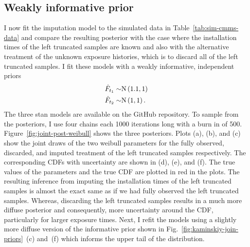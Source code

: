 

\subsection{Weakly informative prior} \label{subsec:weibull-model-fits}

I now fit the imputation model to the simulated data in Table~\ref{tab:sim-cmms-data} and compare the resulting posterior with the case where the installation times of the left truncated samples are known and also with the alternative treatment of the unknown exposure histories, which is to discard all of the left truncated samples. I fit these models with a weakly informative, independent priors
\begin{align*}
    \hat{F}_{t_1} \sim & \hbox{N}\left(1.1, 1\right)  \\
    \hat{F}_{t_2} \sim & \hbox{N}\left(1, 1\right).
\end{align*}
The three stan models are available on the GitHub repository. To sample from the posteriors, I use four chains each 1000 iterations long with a burn in of 500. Figure~\ref{fig:joint-post-weibull} shows the three posteriors. Plots (a), (b), and (c) show the joint draws of the two weibull parameters for the fully observed, discarded, and imputed treatment of the left truncated samples respectively. The corresponding CDFs with uncertainty are shown in (d), (e), and (f). The true values of the parameters and the true CDF are plotted in red in the plots. The resulting inference from imputing the installation times of the left truncated samples is almost the exact same as if we had fully observed the left truncated samples. Whereas, discarding the left truncated samples results in a much more diffuse posterior and consequently, more uncertainty around the CDF, particularly for larger exposure times. Next, I refit the models using a slightly more diffuse version of the informative prior shown in Fig.~\ref{fig:kaminskiy-join-priors}~(c) and~(f) which informs the upper tail of the distribution.

